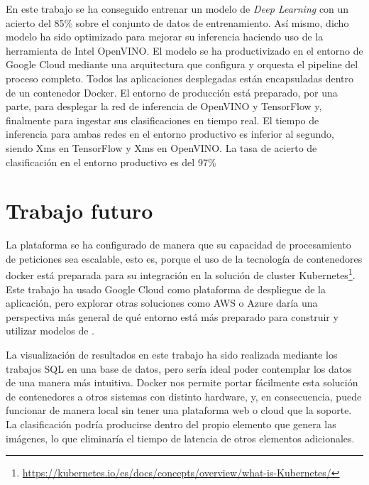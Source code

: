 En este trabajo se ha conseguido entrenar un modelo de \textit{Deep Learning} con un acierto del 85\% sobre el conjunto de datos de entrenamiento.
Así mismo, dicho modelo ha sido optimizado para mejorar su inferencia haciendo uso de la herramienta de Intel OpenVINO\@.
El modelo se ha productivizado en el entorno de Google Cloud mediante una arquitectura que configura y orquesta el pipeline del proceso completo. Todos las aplicaciones desplegadas están encapsuladas dentro de un contenedor Docker.
El entorno de producción está preparado, por una parte, para desplegar la red de inferencia de OpenVINO y TensorFlow y, finalmente para ingestar sus clasificaciones en tiempo real.
El tiempo de inferencia para ambas redes en el entorno productivo es inferior al segundo, siendo Xms en TensorFlow y Xms en OpenVINO\@.
La tasa de acierto de clasificación en el entorno productivo es del 97\%

\section{Trabajo futuro}\label{sec:trabajo-futuro}
La plataforma se ha configurado de manera que su capacidad de procesamiento de peticiones sea escalable, esto es, porque el uso de la tecnología de contenedores docker está preparada para su integración en la solución de cluster Kubernetes\footnote{\url{https://kubernetes.io/es/docs/concepts/overview/what-is-Kubernetes/}}.
Este trabajo ha usado Google Cloud como plataforma de despliegue de la aplicación, pero explorar otras soluciones como AWS o Azure daría una perspectiva más general de qué entorno está más preparado para construir y utilizar modelos de .

La visualización de resultados en este trabajo ha sido realizada mediante los trabajos SQL en una base de datos, pero sería ideal poder contemplar los datos de una manera más intuitiva.
Docker nos permite portar fácilmente esta solución de contenedores a otros sistemas con distinto hardware, y, en consecuencia, puede funcionar de manera local sin tener una plataforma web o cloud que la soporte.
La clasificación podría producirse dentro del propio elemento que genera las imágenes, lo que eliminaría el tiempo de latencia de otros elementos adicionales.

